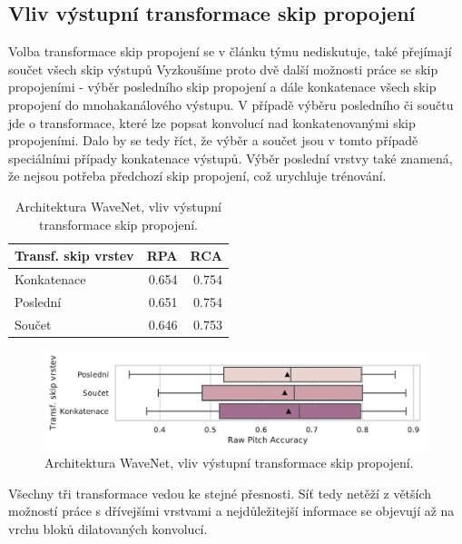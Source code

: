 \subsection{Vliv výstupní transformace skip propojení}

Volba transformace skip propojení se v článku týmu \cite{Oord2016} nediskutuje, \cite{Martak2018} také přejímají součet všech skip výstupů Vyzkoušíme proto dvě další možnosti práce se skip propojeními - výběr posledního skip propojení a dále konkatenace všech skip propojení do mnohakanálového výstupu. V případě výběru posledního či součtu jde o transformace, které lze popsat konvolucí nad konkatenovanými skip propojeními. Dalo by se tedy říct, že výběr a součet jsou v tomto případě speciálními případy konkatenace výstupů. Výběr poslední vrstvy také znamená, že nejsou potřeba předchozí skip propojení, což urychluje trénování.

\begin{table}[h!]
\centering
    \begin{tabular}{lrr}
    \toprule
    Transf. skip vrstev &   RPA &   RCA \\
    \midrule
            Konkatenace & 0.654 & 0.754 \\
            Poslední & 0.651 & 0.754 \\
                Součet & 0.646 & 0.753 \\
    \bottomrule
    \end{tabular}

\caption{Architektura WaveNet, vliv výstupní transformace skip propojení.}\label{tab:wavenet_skip_reduction}
\end{table}

\begin{figure}[h]\centering
    \includegraphics[scale=0.6]{../img/figures/wavenet_skip_reduction.pdf}
\caption{Architektura WaveNet, vliv výstupní transformace skip propojení.}\label{obr:wavenet_skip_reduction}
\end{figure}

Všechny tři transformace vedou ke stejné přesnosti. Síť tedy netěží z větších možností práce s dřívejšími vrstvami a nejdůležitejší informace se objevují až na vrchu bloků dilatovaných konvolucí.

